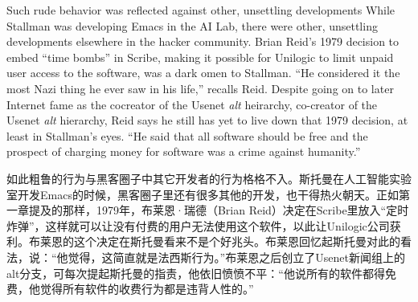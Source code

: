 \ifdefined\eng
\ifdefined\vone Such rude behavior was reflected against other, unsettling developments \fi\ifdefined\vtwo While Stallman was developing Emacs in the AI Lab, there were other, unsettling developments elsewhere \fi in the hacker community. Brian Reid's 1979 decision to embed ``time bombs'' in Scribe, making it possible for Unilogic to limit unpaid user access to the software, was a dark omen to Stallman. ``He considered it the most Nazi thing he ever saw in his life,'' recalls Reid. Despite going on to later Internet fame as the \ifdefined\vone cocreator of the Usenet \textit{alt} heirarchy, \fi\ifdefined\vtwo co-creator of the Usenet \textit{alt} hierarchy, \fi Reid says he still has yet to live down that 1979 decision, at least in Stallman's eyes. ``He said that all software should be free and the prospect of charging money for software was a crime against humanity.''
\fi

\ifdefined\chs
\ifdefined\vone 如此粗鲁的行为与黑客圈子中其它开发者的行为格格不入。\fi\ifdefined\vtwo 斯托曼在人工智能实验室开发Emacs的时候，黑客圈子里还有很多其他的开发，也干得热火朝天。\fi 正如第一章提及的那样，1979年，布莱恩·瑞德（Brian Reid）决定在Scribe里放入``定时炸弹''，这样就可以让没有付费的用户无法使用这个软件，以此让Unilogic公司获利。布莱恩的这个决定在斯托曼看来不是个好兆头。布莱恩回忆起斯托曼对此的看法，说：``他觉得，这简直就是法西斯行为。''布莱恩之后创立了Usenet新闻组上的alt分支，可每次提起斯托曼的指责，他依旧愤愤不平：``他说所有的软件都得免费，他觉得所有软件的收费行为都是违背人性的。''
\fi

